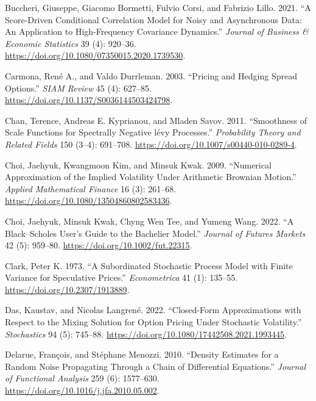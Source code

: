 \documentclass[
  english,
  11pt,
  letterpaper,
  DIV=11,
  numbers=noendperiod]{scrartcl}
\newlength{\cslhangindent}
\newenvironment{CSLReferences}[2] %
 {\begin{list}{}{%
  \setlength{\itemindent}{0pt}
  \setlength{\leftmargin}{0pt}
  \setlength{\parsep}{0pt}
  \ifodd #1
   \setlength{\leftmargin}{\cslhangindent}
   \setlength{\itemindent}{-1\cslhangindent}
  \fi
  \setlength{\itemsep}{#2\baselineskip}}}
 {\end{list}}
\theoremstyle{plain}
\theoremstyle{plain}
\theoremstyle{plain}
\theoremstyle{plain}
\theoremstyle{remark}
\begin{document}
\begin{CSLReferences}{1}{1}
Buccheri, Giuseppe, Giacomo Bormetti, Fulvio Corsi, and Fabrizio Lillo.
2021. {``A Score-Driven Conditional Correlation Model for Noisy and
Asynchronous Data: An Application to High-Frequency Covariance
Dynamics.''} \emph{Journal of Business \& Economic Statistics} 39 (4):
920--36. \url{https://doi.org/10.1080/07350015.2020.1739530}.

Carmona, René A., and Valdo Durrleman. 2003. {``Pricing and Hedging
Spread Options.''} \emph{SIAM Review} 45 (4): 627--85.
\url{https://doi.org/10.1137/S0036144503424798}.

Chan, Terence, Andreas E. Kyprianou, and Mladen Savov. 2011.
{``Smoothness of Scale Functions for Spectrally Negative l{é}vy
Processes.''} \emph{Probability Theory and Related Fields} 150 (3--4):
691--708. \url{https://doi.org/10.1007/s00440-010-0289-4}.

Choi, Jaehyuk, Kwangmoon Kim, and Minsuk Kwak. 2009. {``Numerical
Approximation of the Implied Volatility Under Arithmetic Brownian
Motion.''} \emph{Applied Mathematical Finance} 16 (3): 261--68.
\url{https://doi.org/10.1080/13504860802583436}.

Choi, Jaehyuk, Minsuk Kwak, Chyng Wen Tee, and Yumeng Wang. 2022. {``A
{Black--Scholes} User's Guide to the {Bachelier} Model.''} \emph{Journal
of Futures Markets} 42 (5): 959--80.
\url{https://doi.org/10.1002/fut.22315}.

Clark, Peter K. 1973. {``A Subordinated Stochastic Process Model with
Finite Variance for Speculative Prices.''} \emph{Econometrica} 41 (1):
135--55. \url{https://doi.org/10.2307/1913889}.

Das, Kaustav, and Nicolas Langrené. 2022. {``Closed-Form Approximations
with Respect to the Mixing Solution for Option Pricing Under Stochastic
Volatility.''} \emph{Stochastics} 94 (5): 745--88.
\url{https://doi.org/10.1080/17442508.2021.1993445}.

Delarue, François, and Stéphane Menozzi. 2010. {``Density Estimates for
a Random Noise Propagating Through a Chain of Differential Equations.''}
\emph{Journal of Functional Analysis} 259 (6): 1577--630.
\url{https://doi.org/10.1016/j.jfa.2010.05.002}.


\end{CSLReferences}
\end{document}
